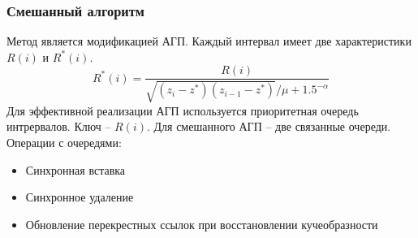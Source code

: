 \documentclass[aspectratio=169]{beamer}
\begin{document}
\begin{frame}
\frametitle{Смешанный алгоритм}
Метод является модификацией АГП. Каждый интервал имеет две
характеристики \(R(i)\) и \(R^*(i)\).
  \begin{displaymath}
  R^*(i)=\frac{R(i)}{\sqrt{(z_i-z^*)(z_{i-1}-z^*)}/\mu + 1.5^{-\alpha}}
  \end{displaymath}
  Для эффективной реализации АГП используется приоритетная
  очередь интрервалов. Ключ – \(R(i)\).
  Для смешанного АГП – две связанные очереди.
  Операции с очередями:
  \begin{itemize}
    \item Синхронная вставка
    \item Синхронное удаление
    \item Обновление перекрестных ссылок при восстановлении кучеобразности
  \end{itemize}
\end{frame}
\end{document}

